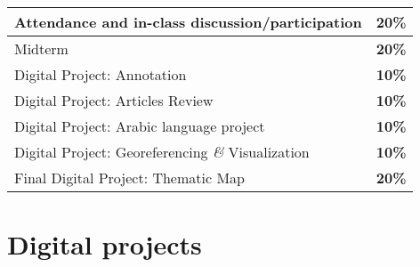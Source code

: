 \documentclass{tufte-handout} %
\def\and{\textit{\&}\xspace}
\begin{document}

\begin{tabular}{l|r}
Attendance and in-class discussion/participation & \textbf{20\%}\\
\hline
Midterm & \textbf{20\%}\\
\hline
Digital Project: Annotation & \textbf{10\%}\\
\hline
Digital Project: Articles Review & \textbf{10\%}\\
\hline
Digital Project: Arabic language project & \textbf{10\%}\\
\hline
Digital Project: Georeferencing \and Visualization & \textbf{10\%}\\
\hline
Final Digital Project: Thematic Map & \textbf{20\%}\\
\end{tabular} 



\section{Digital projects}
\end{document}
